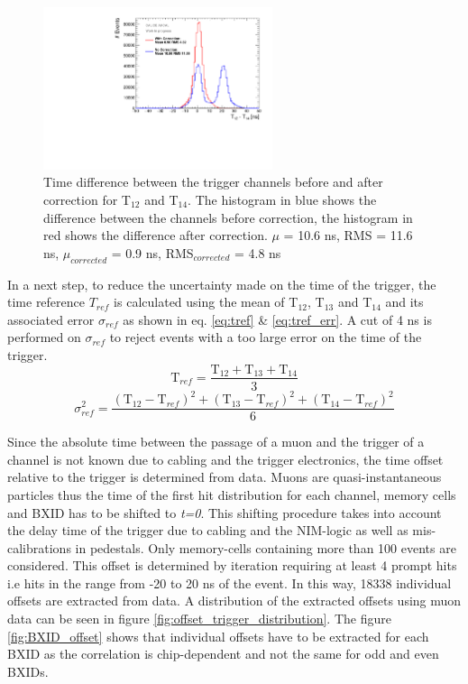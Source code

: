 \begin{figure}[htbp]
\begin{center}
\includegraphics[width=0.6\textwidth]{fig/T0s/T0_Resolution_5.pdf}
\caption{Time difference between the trigger channels before and after correction for T$_{12}$ and T$_{14}$. The histogram in blue shows the difference between the channels before correction, the histogram in red shows the difference after correction. $\mu$ = 10.6 ns, RMS = 11.6 ns, $\mu_{corrected}$ = 0.9 ns, RMS$_{corrected}$ = 4.8 ns}
\label{fig:T0_Correction}
\end{center}
\end{figure}

In a next step, to reduce the uncertainty made on the time of the trigger, the time reference $T_{ref}$ is calculated using the mean of T$_{12}$, T$_{13}$ and T$_{14}$ and its associated error $\sigma_{ref}$ as shown in eq. \ref{eq:tref} \& \ref{eq:tref_err}. A cut of 4 ns is performed on $\sigma_{ref}$ to reject events with a too large error on the time of the trigger.
\begin{equation} \label{eq:tref}
\text{T}_{ref} = \frac{\text{T}_{12} + \text{T}_{13} + \text{T}_{14}}{3}
\end{equation}
\begin{equation} \label{eq:tref_err}
\sigma_{ref}^2 = \frac{ (\text{T}_{12} - \text{T}_{ref})^2 + (\text{T}_{13} - \text{T}_{ref})^2  + (\text{T}_{14} - \text{T}_{ref})^2 }{6}
\end{equation}

Since the absolute time between the passage of a muon and the trigger of a channel is not known due to cabling and the trigger electronics, the time offset relative to the trigger is determined from data. Muons are quasi-instantaneous particles thus the time of the first hit distribution for each channel, memory cells and BXID has to be shifted to \textit{t=0}. This shifting procedure takes into account the delay time of the trigger due to cabling and the NIM-logic as well as mis-calibrations in pedestals. Only memory-cells containing more than 100 events are considered. This offset is determined by iteration requiring at least 4 prompt hits i.e hits in the range from -20 to 20 ns of the event. In this way, 18338 individual offsets are extracted from data. A distribution of the extracted offsets using muon data can be seen in figure \ref{fig:offset_trigger_distribution}. The figure \ref{fig:BXID_offset} shows that individual offsets have to be extracted for each BXID as the correlation is chip-dependent and not the same for odd and even BXIDs.

